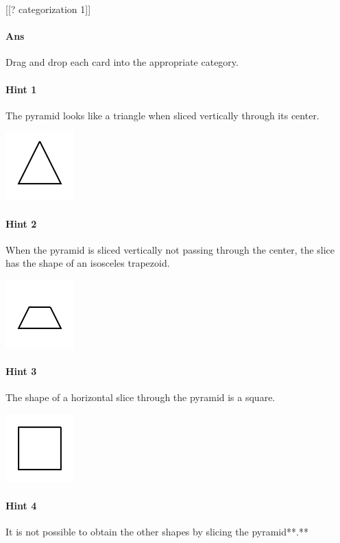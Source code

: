 \documentclass[twocolumn,10pt]{article}
\def\shrinkfactor{0.4}
\begin{document}
[[? categorization 1]]

\paragraph{Ans} Drag and drop each card into the appropriate category. 

\paragraph{Hint 1}The pyramid looks like a triangle when sliced vertically through its center.  

\includegraphics[scale=\shrinkfactor]{figures/d443e0deb4dc18ef30fbf9139d310266f460b66b.png}

\paragraph{Hint 2}When the pyramid is sliced vertically not passing through the center, the slice has the shape of an isosceles trapezoid.   

\includegraphics[scale=\shrinkfactor]{figures/462dbf19e63d9954ed7a531f7ea0e2b0379d9bb9.png}

\paragraph{Hint 3}The shape of a horizontal slice through the pyramid is a square.  

\includegraphics[scale=\shrinkfactor]{figures/4b59a0ece6acc7c19c389e1de534d1df93bf1169.png}

\paragraph{Hint 4}It is not possible to obtain the other shapes by slicing the pyramid**.**
\end{document}
